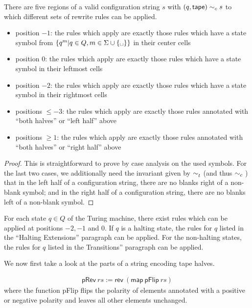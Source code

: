 \documentclass[a4paper,UKenglish,cleveref, autoref]{lipics-v2019}
\begin{document}
\begin{lemma}
  There are five regions of a valid configuration string $s$ with $(q, \textsf{tape}) \sim_c{} s$ to which different sets of rewrite rules can be applied.
  \begin{itemize}
    \item position $-1$: the rules which apply are exactly those rules which have a state symbol from $\{q^m | q \in Q, m \in \Sigma \cup \{\blank \}\}$ in their center cells
    \item position $0$: the rules which apply are exactly those rules which have a state symbol in their leftmost cells
    \item position $-2$: the rules which apply are exactly those rules which have a state symbol in their rightmost cells
    \item positions $\le -3$: the rules which apply are exactly those rules annotated with  ``both halves'' or ``left half'' above
    \item positions $\ge 1$: the rules which apply are exactly those rules annotated with ``both halves'' or ``right half'' above
  \end{itemize}
\end{lemma}
\begin{proof}
  This is straightforward to prove by case analysis on the used symbols. For the last two cases, we additionally need the invariant given by $\sim_t^{}$ (and thus $\sim_c{}$) that in the left half of a configuration string, there are no blanks right of a non-blank symbol; and in the right half of a configuration string, there are no blanks left of a non-blank symbol.
\end{proof}

\begin{lemma}
  For each state $q \in Q$ of the Turing machine, there exist rules which can be applied at positions $-2, -1$ and $0$. If $q$ is a halting state, the rules for $q$ listed in the ``Halting Extensions'' paragraph can be applied. For the non-halting states, the rules for $q$ listed in the Transitions'' paragraph can be applied.
\end{lemma}

We now first take a look at the parts of a string encoding tape halves.

\begin{definition}
  \begin{align*}
    \textsf{pRev}~rs := \textsf{rev}~(\textsf{map}~\textsf{pFlip}~rs)
  \end{align*}
  where the function \textsf{pFlip} flips the polarity of elements annotated with a positive or negative polarity and leaves all other elements unchanged.
\end{definition}
\end{document}
